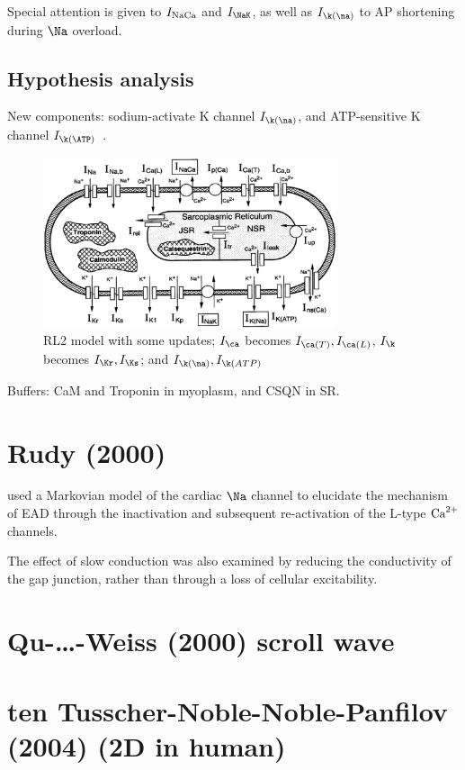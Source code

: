 Special attention is given to $I_{\text{NaCa}}$ and $I_\NaK$, as well as
$I_{\k(\na)}$ to AP shortening during $\Na$ overload. 

\subsection{Hypothesis analysis}
\label{sec:hypothesis-analysis-16}

New components: sodium-activate K channel $I_{\k(\na)}$, and
ATP-sensitive K channel $I_{\k(\ATP)}$~\citep{sanguinetti1990naa}.
\begin{figure}[hbt]
  \centerline{\includegraphics[height=5cm,
    angle=0]{./images/FaberRudy_cell.eps}}
\caption{RL2 model with some updates; $I_\ca$ becomes
  $I_{\ca(T)},I_{\ca(L)}$, $I_{\k}$ becomes $I_\Kr,I_\Ks$; and $I_{\k(\na)},I_{\k(ATP)}$}
\label{fig:FaberRudy_cell}
\end{figure}
Buffers: CaM and Troponin in myoplasm, and CSQN in SR. 

\section{Rudy (2000)}

\citep{rudy2000} used a Markovian model of the cardiac $\Na$ channel to
elucidate the mechanism of EAD through the inactivation and subsequent
re-activation of the L-type ${\text{Ca}^{2+}}$ channels. 

The effect of slow conduction was also examined by reducing the conductivity of
the gap junction, rather than through a loss of cellular excitability.

\section{Qu-\ldots-Weiss (2000) scroll wave}

\citep{qu2000}

\section{ten Tusscher-Noble-Noble-Panfilov (2004) (2D in human)}

